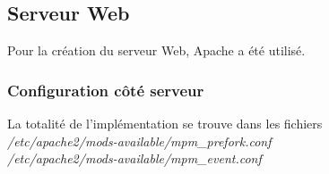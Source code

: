 \subsection{Serveur Web}
\label{subsec:serveur-web}

Pour la création du serveur Web, Apache a été utilisé.

\subsubsection{Configuration côté serveur}
\label{subsubsec:config-srv}

La totalité de l'implémentation se trouve dans les fichiers \\
\textit{/etc/apache2/mods-available/mpm\_prefork.conf} \\
\textit{/etc/apache2/mods-available/mpm\_event.conf}


